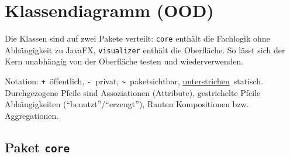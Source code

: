 \documentclass[11pt,a4paper,parskip=half]{scrartcl}
\newcommand{\code}[1]{\texttt{#1}}
\newcommand{\st}[1]{\underline{#1}} %
\begin{document}
\section{Klassendiagramm (OOD)}

Die Klassen sind auf zwei Pakete verteilt: \code{core} enthält die Fachlogik ohne
Abhängigkeit zu JavaFX, \code{visualizer} enthält die Oberfläche. So lässt sich der
Kern unabhängig von der Oberfläche testen und wiederverwenden.

Notation: \code{+}~öffentlich, \code{-}~privat, \code{\textasciitilde}~paketsichtbar,
\st{unterstrichen}~statisch. Durchgezogene Pfeile sind Assoziationen (Attribute),
gestrichelte Pfeile Abhängigkeiten (\enquote{benutzt}/\enquote{erzeugt}), Rauten
Kompositionen bzw. Aggregationen.

\subsection{Paket \code{core}}
\end{document}

